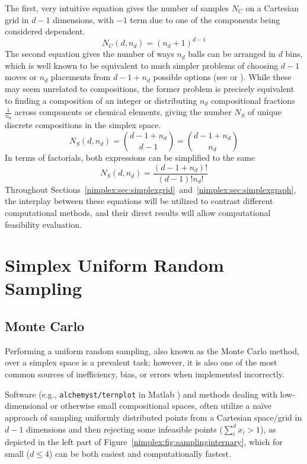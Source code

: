 The first, very intuitive equation gives the number of samples $N_C$ on a Cartesian grid in $d-1$ dimensions, with $-1$ term due to one of the components being considered dependent.
\begin{equation}
    N_C(d, n_d) = (n_d+1)^{d-1}
    \label{nimplex:eq:nc}
\end{equation}
The second equation gives the number of ways $n_d$ balls can be arranged in $d$ bins, which is well known to be equivalent to much simpler problems of choosing $d-1$ moves or $n_d$ placements from $d-1+n_d$ possible options (see \cite{Nijenhuis1978CombinatorialCalculators} or \cite{Chasalow1995AlgorithmPoints}). While these may seem unrelated to compositions, the former problem is precisely equivalent to finding a composition of an integer or distributing $n_d$ compositional fractions $\frac{1}{n_d}$ across components or chemical elements, giving the number $N_S$ of unique discrete compositions in the simplex space.
\begin{equation}
    N_S(d, n_d) = \binom{d-1+n_d}{d-1} = \binom{d-1+n_d}{n_d}
    \label{nimplex:eq:ns1}
\end{equation}
In terms of factorials, both expressions can be simplified to the same
\[N_S(d, n_d) = \frac{(d - 1 + n_d)!}{(d-1)!n_d!}\]
Throughout Sections~\ref{nimplex:sec:simplexgrid}~and~\ref{nimplex:sec:simplexgraph}, the interplay between these equations will be utilized to contrast different computational methods, and their direct results will allow computational feasibility evaluation. 


\section{Simplex Uniform Random Sampling} \label{nimplex:sec:randomuniformsampling}

\subsection{Monte Carlo} \label{nimplex:ssec:mc}

Performing a uniform random sampling, also known as the Monte Carlo method, over a simplex space is a prevalent task; however, it is also one of the most common sources of inefficiency, bias, or errors when implemented incorrectly.

Software (e.g., \texttt{alchemyst/ternplot} in Matlab \cite{Sandrock2017Alchemyst/ternplothttps://github.com/alchemyst/ternplot}) and methods dealing with low-dimensional or otherwise small compositional spaces, often utilize a na\"ive approach of sampling uniformly distributed points from a Cartesian space/grid in $d-1$ dimensions and then rejecting some infeasible points ($\sum^d_i x_i > 1$), as depicted in the left part of Figure~\ref{nimplex:fig:samplinginternary}, which for small ($d \leq 4$) can be both easiest and computationally fastest. 

